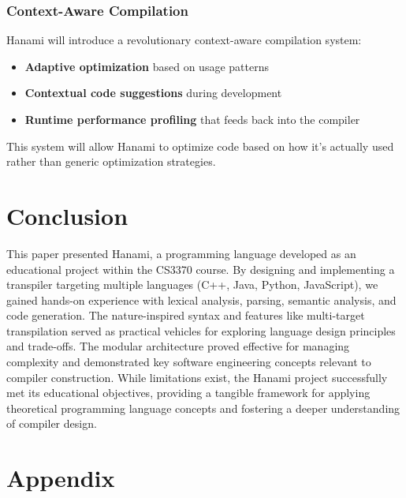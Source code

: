 \documentclass[conference]{IEEEtran}
\begin{document}
\subsubsection{Context-Aware Compilation}
Hanami will introduce a revolutionary context-aware compilation system:
\begin{itemize}
\item \textbf{Adaptive optimization} based on usage patterns
\item \textbf{Contextual code suggestions} during development
\item \textbf{Runtime performance profiling} that feeds back into the compiler
\end{itemize}
This system will allow Hanami to optimize code based on how it's actually used rather than generic optimization strategies.

\section{Conclusion} %
\label{sec:conclusion}

This paper presented Hanami, a programming language developed as an educational project within the CS3370 course. By designing and implementing a transpiler targeting multiple languages (C++, Java, Python, JavaScript), we gained hands-on experience with lexical analysis, parsing, semantic analysis, and code generation. The nature-inspired syntax and features like multi-target transpilation served as practical vehicles for exploring language design principles and trade-offs. The modular architecture proved effective for managing complexity and demonstrated key software engineering concepts relevant to compiler construction. While limitations exist, the Hanami project successfully met its educational objectives, providing a tangible framework for applying theoretical programming language concepts and fostering a deeper understanding of compiler design.





\newpage
\section{Appendix}
\end{document}
